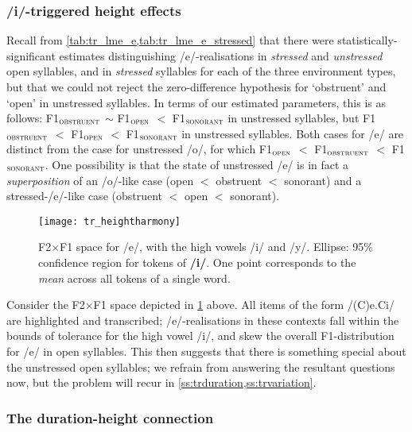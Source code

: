 \subsubsection{/i/-triggered height effects}\label{sss:coarticulation}

Recall from \cref{tab:tr_lme_e,tab:tr_lme_e_stressed} that there were statistically-significant estimates distinguishing /e/-realisations in \emph{stressed} and \emph{unstressed} open syllables, and in \emph{stressed} syllables for each of the three environment types, but that we could not reject the zero-difference hypothesis for `obstruent' and `open' in unstressed syllables. In terms of our estimated parameters, this is as follows: F1$_\textsc{obstruent}$ $\sim$ F1$_\textsc{open}$ $<$ F1$_\textsc{sonorant}$ in unstressed syllables, but F1$_\textsc{obstruent}$ $<$ F1$_\textsc{open}$ $<$ F1$_\textsc{sonorant}$ in unstressed syllables. Both cases for /e/ are distinct from the case for unstressed /o/, for which F1$_\textsc{open}$ $<$ F1$_\textsc{obstruent}$ $<$ F1$_\textsc{sonorant}$. One possibility is that the state of unstressed /e/ is in fact a \emph{superposition} of an /o/-like case (open $<$ obstruent $<$ sonorant) and a stressed-/e/-like case (obstruent $<$ open $<$ sonorant).

\begin{figure}[H]
  \centering
  \texttt{[image: tr\_heightharmony]}
  \caption[F2$\times$F1 space for /e/ in unstressed open syllables.]{F2$\times$F1 space for /e/, with the high vowels /i/ and /y/. Ellipse: 95\% confidence region for tokens of \textbf{/i/}. One point corresponds to the \emph{mean} across all tokens of a single word.}
  \label{fig:trheightharmony}
\end{figure}

Consider the F2$\times$F1 space depicted in \cref{fig:trheightharmony} above. All items of the form /(C)e.Ci/ are highlighted and transcribed; /e/-realisations in these contexts fall within the bounds of tolerance for the high vowel /i/, and skew the overall F1-distribution for /e/ in open syllables. This then suggests that there is something special about the unstressed open syllables; we refrain from answering the resultant questions now, but the problem will recur in \cref{ss:trduration,ss:trvariation}.

\subsubsection{The duration-height connection}

